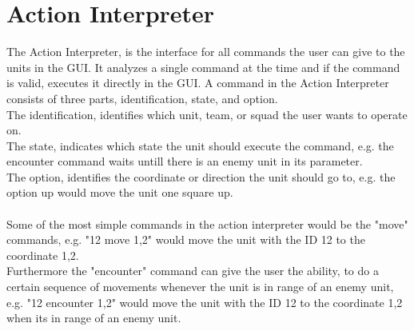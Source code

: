\section{Action Interpreter}
The Action Interpreter, is the interface for all commands the user can give to the units in the GUI. 
It analyzes a single command at the time and if the command is valid, executes it directly in the GUI.
A command in the Action Interpreter consists of three parts, identification, state, and option.\\
The identification, identifies which unit, team, or squad the user wants to operate on.\\
The state, indicates which state the unit should execute the command, e.g. the encounter command waits untill there is an enemy unit in its parameter.\\
The option, identifies the coordinate or direction the unit should go to, e.g. the option up would move the unit one square up.\\
\\
Some of the most simple commands in the action interpreter would be the "move" commands, e.g. "12 move 1,2" would move the unit with the ID 12 to the coordinate 1,2.
\\
Furthermore the "encounter" command can give the user the ability, to do a certain sequence of movements whenever the unit is in range of an enemy unit, e.g. "12 encounter 1,2" would move the unit with the ID 12 to the coordinate 1,2 when its in range of an enemy unit.


